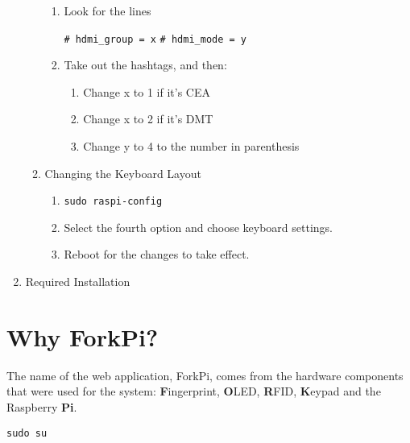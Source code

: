 \begin{enumerate}
\begin{enumerate}[label*=\arabic*.]
\begin{enumerate}[label*=\arabic*.]
                    \item Look for the lines
                    
                    \texttt{# hdmi_group = x}
                    \texttt{# hdmi_mode = y}
                    
                    \item Take out the hashtags, and then:
                    
                        \begin{enumerate}[label*=\arabic*.]
                        \item Change x to 1 if it's CEA
                        \item Change x to 2 if it's DMT
                        \item Change y to 4 to the number in parenthesis
                        \end{enumerate}
                
                \end{enumerate}
            
            \item Changing the Keyboard Layout
                \begin{enumerate}[label*=\arabic*.]
                    \item \texttt{sudo raspi-config}
                    \item Select the fourth option and choose keyboard settings.
                    \item Reboot for the changes to take effect.
                \end{enumerate}
        \end{enumerate}

    \item Required Installation
\end{enumerate}

\section{Why ForkPi?}
The name of the web application, ForkPi, comes from the hardware components that were used for the system: \textbf{F}ingerprint, \textbf{O}LED, \textbf{R}FID, \textbf{K}eypad and the Raspberry \textbf{Pi}.

\texttt{sudo su}